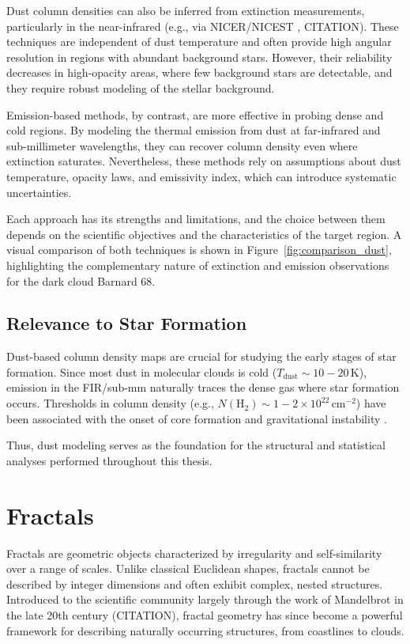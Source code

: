 Dust column densities can also be inferred from extinction measurements, particularly in the near-infrared (e.g., via NICER/NICEST , CITATION). These techniques are independent of dust temperature and often provide high angular resolution in regions with abundant background stars. However, their reliability decreases in high-opacity areas, where few background stars are detectable, and they require robust modeling of the stellar background.

Emission-based methods, by contrast, are more effective in probing dense and cold regions. By modeling the thermal emission from dust at far-infrared and sub-millimeter wavelengths, they can recover column density even where extinction saturates. Nevertheless, these methods rely on assumptions about dust temperature, opacity laws, and emissivity index, which can introduce systematic uncertainties.

Each approach has its strengths and limitations, and the choice between them depends on the scientific objectives and the characteristics of the target region. A visual comparison of both techniques is shown in Figure~\ref{fig:comparison_dust}, highlighting the complementary nature of extinction and emission observations for the dark cloud Barnard 68.

\subsection{Relevance to Star Formation}

Dust-based column density maps are crucial for studying the early stages of star formation. Since most dust in molecular clouds is cold ($T_\mathrm{dust} \sim 10{-}20\,\mathrm{K}$), emission in the FIR/sub-mm naturally traces the dense gas where star formation occurs. Thresholds in column density (e.g., $N(\mathrm{H}_2) \sim 1{-}2 \times 10^{22}\,\mathrm{cm}^{-2}$) have been associated with the onset of core formation and gravitational instability \cite{lada2010star}.

Thus, dust modeling serves as the foundation for the structural and statistical analyses performed throughout this thesis.

\section{Fractals}

Fractals are geometric objects characterized by irregularity and self-similarity over a range of scales. Unlike classical Euclidean shapes, fractals cannot be described by integer dimensions and often exhibit complex, nested structures. Introduced to the scientific community largely through the work of Mandelbrot in the late 20th century (CITATION), fractal geometry has since become a powerful framework for describing naturally occurring structures, from coastlines to clouds.


